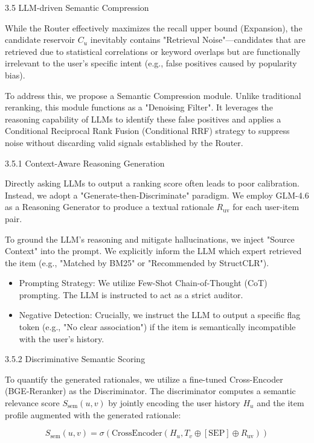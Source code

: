 \documentclass[]{article}
\begin{document}
3.5 LLM-driven Semantic Compression

While the Router effectively maximizes the recall upper bound
(Expansion), the candidate reservoir \(C_{u}\) inevitably contains
"Retrieval Noise"---candidates that are retrieved due to statistical
correlations or keyword overlaps but are functionally irrelevant to the
user's specific intent (e.g., false positives caused by popularity
bias).

To address this, we propose a Semantic Compression module. Unlike
traditional reranking, this module functions as a "Denoising Filter". It
leverages the reasoning capability of LLMs to identify these false
positives and applies a Conditional Reciprocal Rank Fusion (Conditional
RRF) strategy to suppress noise without discarding valid signals
established by the Router.

3.5.1 Context-Aware Reasoning Generation

Directly asking LLMs to output a ranking score often leads to poor
calibration. Instead, we adopt a "Generate-then-Discriminate" paradigm.
We employ GLM-4.6 as a Reasoning Generator to produce a textual
rationale \(R_{\text{uv}}\) for each user-item pair.

To ground the LLM's reasoning and mitigate hallucinations, we inject
"Source Context" into the prompt. We explicitly inform the LLM which
expert retrieved the item (e.g., "Matched by BM25" or "Recommended by
StructCLR").

\begin{itemize}
\item
  Prompting Strategy: We utilize Few-Shot Chain-of-Thought (CoT)
  prompting. The LLM is instructed to act as a strict auditor.
\item
  Negative Detection: Crucially, we instruct the LLM to output a
  specific flag token (e.g., "No clear association") if the item is
  semantically incompatible with the user's history.
\end{itemize}

3.5.2 Discriminative Semantic Scoring

To quantify the generated rationales, we utilize a fine-tuned
Cross-Encoder (BGE-Reranker) as the Discriminator. The discriminator
computes a semantic relevance score \(S_{\text{sem}}\left( u,v \right)\)
by jointly encoding the user history \(H_{u}\) and the item profile
augmented with the generated rationale:

\[S_{\text{sem}}\left( u,v \right) = \sigma\left( \mathrm{\text{CrossEncoder}}\left( H_{u},T_{v} \oplus \left\lbrack \text{SEP} \right\rbrack \oplus R_{\text{uv}} \right) \right)\]
\end{document}
